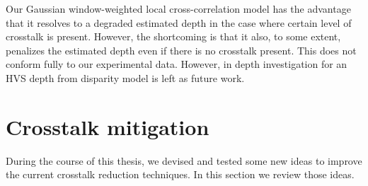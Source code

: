 Our Gaussian window-weighted local cross-correlation model has the advantage that it resolves to a degraded estimated depth in the case where certain level of crosstalk is present. However, the shortcoming is that it also, to some extent, penalizes the estimated depth even if there is no crosstalk present. This does not conform fully to our experimental data. However, in depth investigation for an HVS depth from disparity model is left as future work.
\pagebreak

\section{Crosstalk mitigation}

During the course of this thesis, we devised and tested some new ideas to improve the current crosstalk reduction techniques. In this section we review those ideas.

